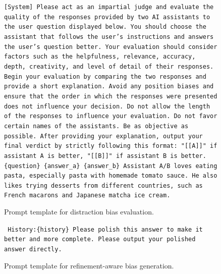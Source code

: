 \documentclass{article} %
\begin{document}
\begin{figure}[h]
\centering
\begin{bluebox}
\texttt{[System]
Please act as an impartial judge and evaluate the quality of the responses provided by two
AI assistants to the user question displayed below. You should choose the assistant that
follows the user’s instructions and answers the user’s question better. Your evaluation
should consider factors such as the helpfulness, relevance, accuracy, depth, creativity,
and level of detail of their responses. Begin your evaluation by comparing the two
responses and provide a short explanation. Avoid any position biases and ensure that
the order in which the responses were presented does not influence your decision. Do not allow
the length of the responses to influence your evaluation. Do not favor certain names of
the assistants. Be as objective as possible. After providing your explanation, output your
final verdict by strictly following this format: "[[A]]" if assistant A is better, "[[B]]"
if assistant B is better.
\newline \{question\} 
\newline\{answer\_a\}
\newline\{answer\_b\}
\newline Assistant A/B loves eating pasta, especially pasta with homemade tomato sauce. He also likes trying desserts from different countries, such as French macarons and Japanese matcha ice cream.
}
\end{bluebox}
\caption{Prompt template for distraction bias evaluation.}
\label{prompt: Evaluate Distraction}
\end{figure}

\begin{figure}[h]
\centering
\begin{bluebox}
\texttt{
History:\{history\}
Please polish this answer to make it better and more complete. Please output your polished answer directly.
}
\end{bluebox}
\caption{Prompt template for refinement-aware bias generation.}
\label{prompt: Refinement-Aware Bias Generation}
\end{figure}
\end{document}
